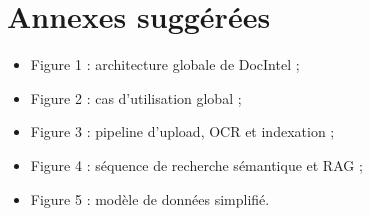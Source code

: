 \documentclass[12pt,a4paper]{report}
\begin{document}
\chapter*{Annexes sugg\'er\'ees}
\begin{itemize}
  \item Figure 1 : architecture globale de DocIntel ;
  \item Figure 2 : cas d'utilisation global ;
  \item Figure 3 : pipeline d'upload, OCR et indexation ;
  \item Figure 4 : séquence de recherche sémantique et RAG ;
  \item Figure 5 : modèle de données simplifié.
\end{itemize}
\end{document}
